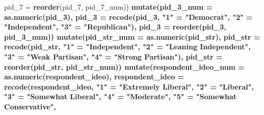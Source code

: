 \documentclass[
]{article}
\newenvironment{Shaded}{\begin{snugshade}}{\end{snugshade}}
\newcommand{\DataTypeTok}[1]{\textcolor[rgb]{0.13,0.29,0.53}{#1}}
\newcommand{\DecValTok}[1]{\textcolor[rgb]{0.00,0.00,0.81}{#1}}
\newcommand{\KeywordTok}[1]{\textcolor[rgb]{0.13,0.29,0.53}{\textbf{#1}}}
\newcommand{\NormalTok}[1]{#1}
\newcommand{\OperatorTok}[1]{\textcolor[rgb]{0.81,0.36,0.00}{\textbf{#1}}}
\newcommand{\StringTok}[1]{\textcolor[rgb]{0.31,0.60,0.02}{#1}}
\begin{document}
\begin{Shaded}
\begin{Highlighting}[]
{{{{{{{{{{{{{{{{{{{{{{{{{{{{{{{{{{{{{{{{{{{{{{{{{{{{{{{{{{{{{{{{{{{{{{{{{{{{{{{{{{{{{{{{{{{{{{{{{{{{{{                 \DataTypeTok{pid_7 =} \KeywordTok{reorder}\NormalTok{(pid_}\DecValTok{7}\NormalTok{, pid_}\DecValTok{7}\NormalTok{_num))}\OperatorTok{%>%}
\StringTok{    }\KeywordTok{mutate}\NormalTok{(}\DataTypeTok{pid_3_num =} \KeywordTok{as.numeric}\NormalTok{(pid_}\DecValTok{3}\NormalTok{),}
                 \DataTypeTok{pid_3 =} \KeywordTok{recode}\NormalTok{(pid_}\DecValTok{3}\NormalTok{, }
                                             \StringTok{"1"}\NormalTok{ =}\StringTok{ "Democrat"}\NormalTok{, }
                                             \StringTok{"2"}\NormalTok{ =}\StringTok{ "Independent"}\NormalTok{, }
                                             \StringTok{"3"}\NormalTok{ =}\StringTok{ "Republican"}\NormalTok{),}
                 \DataTypeTok{pid_3 =} \KeywordTok{reorder}\NormalTok{(pid_}\DecValTok{3}\NormalTok{, pid_}\DecValTok{3}\NormalTok{_num))}\OperatorTok{%>%}
\StringTok{    }\KeywordTok{mutate}\NormalTok{(}\DataTypeTok{pid_str_num =} \KeywordTok{as.numeric}\NormalTok{(pid_str),}
                 \DataTypeTok{pid_str =} \KeywordTok{recode}\NormalTok{(pid_str, }
                                                 \StringTok{"1"}\NormalTok{ =}\StringTok{ "Independent"}\NormalTok{, }
                                                 \StringTok{"2"}\NormalTok{ =}\StringTok{ "Leaning Independent"}\NormalTok{, }
                                                 \StringTok{"3"}\NormalTok{ =}\StringTok{ "Weak Partisan"}\NormalTok{, }
                                                 \StringTok{"4"}\NormalTok{ =}\StringTok{ "Strong Partisan"}\NormalTok{),}
                 \DataTypeTok{pid_str =} \KeywordTok{reorder}\NormalTok{(pid_str, pid_str_num))}\OperatorTok{%>%}
\StringTok{    }\KeywordTok{mutate}\NormalTok{(}\DataTypeTok{respondent_ideo_num =} \KeywordTok{as.numeric}\NormalTok{(respondent_ideo),}
                 \DataTypeTok{respondent_ideo =} \KeywordTok{recode}\NormalTok{(respondent_ideo, }
                                                                 \StringTok{"1"}\NormalTok{ =}\StringTok{ "Extremely Liberal"}\NormalTok{, }
                                                                 \StringTok{"2"}\NormalTok{ =}\StringTok{ "Liberal"}\NormalTok{, }
                                                                 \StringTok{"3"}\NormalTok{ =}\StringTok{ "Somewhat Liberal"}\NormalTok{, }
                                                                 \StringTok{"4"}\NormalTok{ =}\StringTok{ "Moderate"}\NormalTok{, }
                                                                 \StringTok{"5"}\NormalTok{ =}\StringTok{ "Somewhat Conservative"}\NormalTok{, }
}}}}}}}}}}}}}}}}}}}}}}}}}}}}}}}}}}}}}}}}}}}}}}}}}}}}}}}}}}}}}}}}}}}}}}}}}}}}}}}}}}}}}}}}}}}}}}}}}}}}}}}}}
\end{Highlighting}
\end{Shaded}
\end{document}
